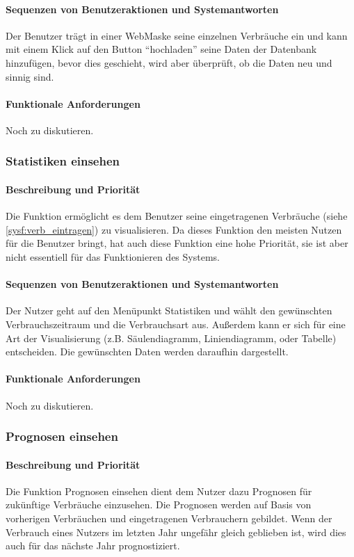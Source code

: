 \paragraph{Sequenzen von Benutzeraktionen und Systemantworten}
Der Benutzer trägt in einer WebMaske seine einzelnen Verbräuche ein und kann mit einem Klick auf den Button “hochladen” seine Daten der Datenbank hinzufügen, bevor dies geschieht, wird aber überprüft, ob die Daten neu und sinnig sind. %
\paragraph{Funktionale Anforderungen}
Noch zu diskutieren.

\subsubsection{Statistiken einsehen}
\paragraph{Beschreibung und Priorität}
Die Funktion ermöglicht es dem Benutzer seine eingetragenen Verbräuche (siehe \ref{sysf:verb_eintragen}) zu visualisieren. Da dieses Funktion den meisten Nutzen für die Benutzer bringt, hat auch diese Funktion eine hohe Priorität, sie ist aber nicht essentiell für das Funktionieren des Systems.

\paragraph{Sequenzen von Benutzeraktionen und Systemantworten}

Der Nutzer geht auf den Menüpunkt Statistiken und wählt den gewünschten Verbrauchszeitraum und die Verbrauchsart aus. Außerdem kann er sich für eine Art der Visualisierung (z.B. Säulendiagramm, Liniendiagramm, oder Tabelle) entscheiden. Die gewünschten Daten werden daraufhin dargestellt.

\paragraph{Funktionale Anforderungen}
Noch zu diskutieren.

\subsubsection{Prognosen einsehen}
\paragraph{Beschreibung und Priorität}
Die Funktion Prognosen einsehen dient dem Nutzer dazu Prognosen für zukünftige Verbräuche einzusehen. Die Prognosen werden auf Basis von vorherigen Verbräuchen und eingetragenen Verbrauchern gebildet. Wenn der Verbrauch eines Nutzers im letzten Jahr ungefähr gleich geblieben ist, wird dies auch für das nächste Jahr prognostiziert.
